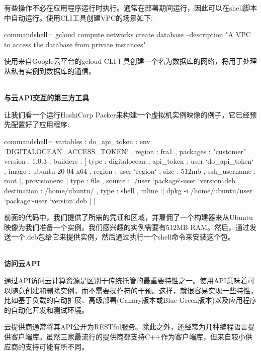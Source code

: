 有些操作不必在应用程序运行时执行。通常在部署期间运行，因此可以在shell脚本中自动运行。使用CLI工具创建VPC的场景如下:

\begin{tcblisting}{commandshell={}}
gcloud compute networks create database --description "A VPC to access the database from private instances"
\end{tcblisting}

使用来自Google云平台的gcloud CLI工具创建一个名为数据库的网络，将用于处理从私有实例到数据库的通信。

\hspace*{\fill} \\ %
\noindent
\textbf{与云API交互的第三方工具}

让我们看一个运行HashiCorp Packer来构建一个虚拟机实例映像的例子，它已经预先配置好了应用程序:

\begin{tcblisting}{commandshell={}}
{
  variables : {
    do_api_token : {{env `DIGITALOCEAN_ACCESS_TOKEN`}} ,
    region : fra1 ,
    packages : "customer"
    version : 1.0.3
  },
  builders : [
    {
      type : digitalocean ,
      api_token : {{user `do_api_token`}} ,
      image : ubuntu-20-04-x64 ,
      region : {{user `region`}} ,
      size : 512mb ,
      ssh_username : root
    }
  ],
  provisioners: [
    {
      type : file ,
      source : ./{{user `package`}}-{{user `version`}}.deb ,
      destination : /home/ubuntu/
    },
    {
      type : shell ,
      inline :[
        dpkg -i /home/ubuntu/{{user `package`}}-{{user `version`}}.deb
      ]
    }
  ]
}
\end{tcblisting}

前面的代码中，我们提供了所需的凭证和区域，并雇佣了一个构建器来从Ubuntu映像为我们准备一个实例。我们感兴趣的实例需要有512MB RAM。然后，通过发送一个.deb包给它来提供实例，然后通过执行一个shell命令来安装这个包。

\hspace*{\fill} \\ %
\noindent
\textbf{访问云API}

通过API访问云计算资源是区别于传统托管的最重要特性之一。使用API意味着可以随意创建和删除实例，而不需要操作符的干预。这样，就很容易实现一些特性，比如基于负载的自动扩展、高级部署(Canary版本或Blue-Green版本)以及应用程序的自动化开发和测试环境。

云提供商通常将其API公开为RESTful服务。除此之外，还经常为几种编程语言提供客户端库。虽然三家最流行的提供商都支持C++作为客户端库，但来自较小供应商的支持可能有所不同。

